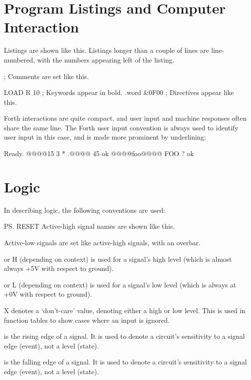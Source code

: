 \section{Program Listings and Computer Interaction}

Listings are shown like this. Listings longer than a couple of lines are
line-numbered, with the numbers appearing left of the listing.

\begin{cftasmcode}
; Comments are set like this.

LOAD R 10    ; Keywords appear in bold.
.word &0F00  ; Directives appear like this.
\end{cftasmcode}

\noindent Forth interactions are quite compact, and user input and machine
responses often share the same line. The Forth user input convention is always
used to identify user input in this case, and is made more prominent by
underlining:

\begin{intrcode}
Ready.
@@@@15 3 * .@@@@ 45  ok
@@@@foo@@@@ FOO ?  ok
\end{intrcode}

\section{Logic}

In describing logic, the following conventions are used:

\begin{description}

\item \ps{RESET} Active-high signal names are shown like this.

\item {} Active-low signals are set like active-high signals, with an overbar.

\item {} or \textsf{H} (depending on context) is used for a
  signal's high level (which is almost always +5V with respect to
  ground).

\item {} or \textsf{L} (depending on context) is used for a
  signal's low level (which is always at +0V with respect to ground).

\item \textsf{X} denotes a ‘don't-care’ value, denoting either a high
  or low level. This is used in function tables to show cases where an
  input is ignored.

\item \tU{} is the rising edge of a signal. It is used to denote a
  circuit's sensitivity to a signal edge (event), not a level (state).

\item \tD{} is the falling edge of a signal. It is used to denote a
  circuit's sensitivity to a signal edge (event), not a level (state).

\end{description}

